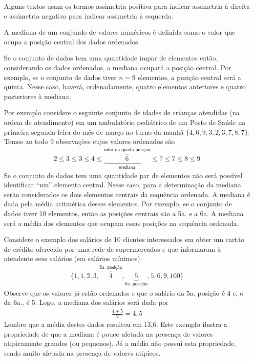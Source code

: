 Alguns textos usam os termos assimetria positiva para indicar assimetria à direita e assimetria negativa para indicar assimetria à esquerda.


A mediana de um conjundo de valores numéricos é definida como o valor que ocupa a posição central dos dados ordenados.

Se o conjunto de dados tem uma quantidade ímpar de elementos então, considerando os dados ordenados, a mediana ocupará a posição central. Por exemplo, se o conjunto de dados tiver \(n=9\) elementos,  a posição central será a quinta. Nesse caso, haverá, ordenadamente, quatro elementos anteriores e quatro posteriores à mediana.

Por exemplo considere o seguinte conjunto de idades de crianças atendidas (na ordem de atendimento) em um ambulatório pediátrico de um Posto de Saúde na primeira segunda-feira do mês de março no turno da manhã \(\{4,6,9,3,2,3,7,8,7\}\). Temos ao todo 9 observações cujos valores ordenados são
\begin{equation*}
\begin{split}2 \leq 3 \leq 3 \leq 4 \leq \underbrace{\overbrace{6}^{\textsf{valor da quinta posição}}}_{\textsf{mediana}} \leq 7 \leq 7 \leq 8 \leq 9\end{split}
\end{equation*}
Se o conjunto de dados tem uma quantidade par de elementos não será possível identificar “um” elemento central. Nesse caso, para a determinação da mediana serão considerados os dois elementos centrais da sequência ordenada. A mediana é dada pela média aritmética desses elementos. Por exemplo, se o conjunto de dados tiver 10 elementos, então as posições centrais são a 5a. e a 6a. A mediana será a média dos elementos que ocupam essas posições na sequência ordenada.

Considere o exemplo dos salários de 10 clientes interessados em obter um cartão de crédito oferecido por uma rede de supermercados e que informaram à atendente seus salários (em salários mínimos):
\begin{equation*}
\begin{split}\{1, 1, 2, 3, \overbrace{4}^{\textsf{5a. posição}}, \underbrace{5}_{\textsf{6a. posição}}, 5, 6, 9, 100\}\end{split}
\end{equation*}
Observe que os valores já estão ordenados e que o salário da 5a. posição é 4 e, o da 6a., é 5. Logo, a mediana dos salários será dada por
\begin{equation*}
\begin{split}\frac{4+5}{2}=4,5\end{split}
\end{equation*}
Lembre que a média destes dados resultou em 13,6. Este exemplo ilustra a propriedade de que a mediana é pouco afetada na presença de valores atipicamente grandes (ou pequenos). Já a média não possui esta propriedade, sendo muito afetada na presença de valores atípicos.

